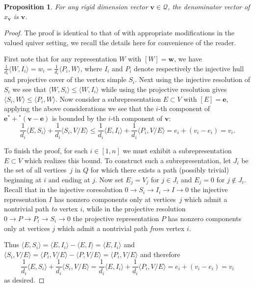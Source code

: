 \documentclass[pdftex]{sigma}
\newcommand{\bfe}{\mathbf{e}}
\newcommand{\bfv}{\mathbf{v}}
\newcommand{\bfw}{\mathbf{w}}
\newcommand{\cQ}{\mathcal{Q}}
\numberwithin{equation}{section}
\newtheorem{Proposition}[Theorem]{Proposition}
 { \theoremstyle{definition}
\newtheorem{Remark}[Theorem]{Remark} }
\begin{document}
\begin{Proposition}\label{prop:denominators} For any rigid dimension vector $\bfv\in\cQ$, the denominator vector of $x_\bfv$ is $\bfv$.
 \end{Proposition}
\begin{proof} The proof is identical to that of \cite[Section~4, Corollary~2]{caldero-keller} with appropriate modifications in the valued quiver setting, we recall the details here for convenience of the reader.

First note that for any representation $W$ with $[W]=\bfw$, we have $\frac{1}{d_i}\langle W,I_i\rangle=w_i=\frac{1}{d_i}\langle P_i,W\rangle$, where $I_i$ and $P_i$ denote respectively the injective hull and projective cover of the vertex simple $S_i$. Next using the injective resolution of $S_i$ we see that $\langle W,S_i\rangle\le\langle W,I_i\rangle$ while using the projective resolution gives $\langle S_i,W\rangle\le\langle P_i,W\rangle$. Now consider a subrepresentation $E\subset V$ with $[E]=\bfe$, applying the above considerations we see that the $i$-th component of $\bfe^*+{}^*(\bfv-\bfe)$ is bounded by the $i$-th component of $\bfv$:
 \[\frac{1}{d_i}\langle E,S_i\rangle+\frac{1}{d_i}\langle S_i,V/E\rangle\le\frac{1}{d_i}\langle E,I_i\rangle+\frac{1}{d_i}\langle P_i,V/E\rangle=e_i+(v_i-e_i)=v_i.\]

 To finish the proof, for each $i\in[1, n]$ we must exhibit a subrepresentation $E\subset V$ which realizes this bound.
 To construct such a subrepresentation, let $J_i$ be the set of all vertices~$j$ in $Q$ for which there exists a path (possibly trivial) beginning at $i$ and ending at $j$.
 Now set $E_j=V_j$ for $j\in J_i$ and $E_j=0$ for $j\notin J_i$.
 Recall that in the injective coresolution $0\rightarrow S_i\rightarrow I_i\rightarrow I\rightarrow 0$ the injective representation $I$ has nonzero components only at vertices~$j$ which admit a nontrivial path \emph{to} vertex $i$, while in the projective resolution $0\rightarrow P\rightarrow P_i\rightarrow S_i\rightarrow 0$ the projective representation $P$ has nonzero components only at vertices $j$ which admit a nontrivial path \emph{from} vertex $i$.

 Thus $\langle E,S_i\rangle=\langle E,I_i\rangle-\langle E,I\rangle=\langle E,I_i\rangle$ and $\langle S_i,V/E\rangle=\langle P_i,V/E\rangle-\langle P,V/E\rangle=\langle P_i,V/E\rangle$ and therefore
 \[\frac{1}{d_i}\langle E,S_i\rangle+\frac{1}{d_i}\langle S_i,V/E\rangle=\frac{1}{d_i}\langle E,I_i\rangle+\frac{1}{d_i}\langle P_i,V/E\rangle=e_i+(v_i-e_i)=v_i\]
 as desired.
 \end{proof}
\end{document}
